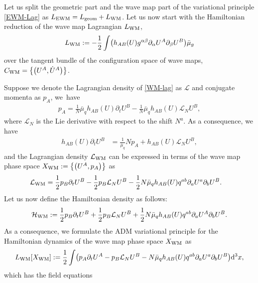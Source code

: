 \documentclass[pdftex]{sigma}
\def\ptl{\partial}%
\def\mbo#1{\boldsymbol{#1}}%
\def\halb{\frac{1}{2}}%
\def \a{\alpha}
\def \b {\beta}
\renewcommand{\a}{\alpha}
\renewcommand{\b}{\beta}
\numberwithin{equation}{section}
\begin{document}
 Let us split the geometric part and the wave map part of the variational principle \eqref{EWM-Lag} as $L_{{\rm EWM}} = L_{{\rm geom}} + L_{{\rm WM}}$. %
 Let us now start with the Hamiltonian reduction of the wave map Lagrangian $L_{{\rm WM}}$,
 \begin{align}\label{WM-lag}
L_{{\rm WM}} := -\halb\int \bigl(h_{AB} (U) g^{\a \b} \ptl_\a U^A \ptl_\b U^B\bigr) \bar{\mu}_g
\end{align}
 over the tangent bundle of the configuration space of wave maps, $C_{{\rm WM}} = \bigl\{ \bigl(U^A, \dot{U}^A\bigr) \bigr\}$.


Suppose we denote the Lagrangian density of \eqref{WM-lag} as $\mathcal{L}$ and conjugate momenta as $p_A$, we~have
\begin{align*}
p_A = \frac{1}{N} \bar{\mu}_q h_{AB}(U) \ptl_t U^B - \frac{1}{N} \bar{\mu}_q h_{AB} (U) \mathcal{L}_N U^B,
\end{align*}
where $\mathcal{L}_N$ is the Lie derivative with respect to the shift $N^a$. As a consequence, we have
\begin{align*}
h_{AB} (U)\ptl_t U^B &{}= \frac{1}{\bar{\mu}_q} N p_A + h_{AB} (U) \mathcal{L}_N U^B,
\end{align*}
and the Lagrangian density $\mathcal{L}_{{\rm WM}}$ can be expressed in terms of the wave map phase space $X_{{\rm WM}} := \bigl\{ \bigl(U^A, p_A\bigr) \bigr\}$ as
\begin{align*}
\mathcal{L}_{{\rm WM}} &{}= \halb p_B \ptl_t U^B - \halb p_B \mathcal{L}_N U^B - \halb N \bar{\mu}_q h_{AB} (U) q^{ab} \ptl_a U^a \ptl_b U^B.
\end{align*}
Let us now define the Hamiltonian density as follows:
\begin{align*}
\mathcal{H}_{{\rm WM}} := \halb p_B \ptl_t U^B + \halb p_B \mathcal{L}_N U^B + \halb N \bar{\mu}_q h_{AB} (U) q^{ab} \ptl_a U^A \ptl_b U^B.
\end{align*}
As a consequence, we formulate the ADM variational principle for the Hamiltonian dynamics of the wave map phase space $X_{{\rm WM}}$ as
\begin{align*}
L_{{\rm WM}} [X_{{\rm WM}}] := \halb \int \bigl(p_A \ptl_t U^A - p_B \mathcal{L}_N U^B - N \bar{\mu}_q h_{AB} (U) q^{ab} \ptl_a U^a \ptl_b U^B\bigr){\rm d}^3x,
\end{align*}
which has the field equations
\end{document}
